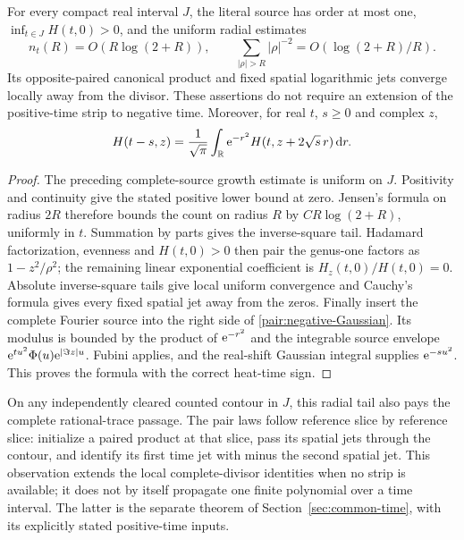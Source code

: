 \begin{proposition}
\label{pair:compact-time}
For every compact real interval $J$, the literal source has order at
most one, $\inf_{t\in J}H(t,0)>0$, and the uniform radial estimates
\[
 n_t(R)=O(R\log(2+R)),\qquad
 \sum_{|\rho|>R}|\rho|^{-2}=O(\log(2+R)/R).
\]
Its opposite-paired canonical product and fixed spatial logarithmic
jets converge locally away from the divisor. These assertions do not
require an extension of the positive-time strip to negative time.
Moreover, for real $t$, $s\ge0$ and complex $z$,
\begin{equation}
 H(t-s,z)=\frac1{\sqrt\pi}\int_\mathbb R
          \mathrm e^{-r^2}H(t,z+2\sqrt{s}\,r)\,\mathrm d r.
 \label{pair:negative-Gaussian}
\end{equation}
\end{proposition}
\begin{proof}
The preceding complete-source growth estimate is uniform on $J$.
Positivity and continuity give the stated positive lower bound at zero.
Jensen's formula on radius $2R$ therefore bounds the count on radius
$R$ by $C R\log(2+R)$, uniformly in $t$. Summation by parts gives the
inverse-square tail. Hadamard factorization, evenness and $H(t,0)>0$
then pair the genus-one factors as $1-z^2/\rho^2$; the remaining linear
exponential coefficient is $H_z(t,0)/H(t,0)=0$. Absolute inverse-square
tails give local uniform convergence and Cauchy's formula gives every
fixed spatial jet away from the zeros. Finally insert the complete
Fourier source into the right side of \eqref{pair:negative-Gaussian}.
Its modulus is bounded by the product of $\mathrm e^{-r^2}$ and the integrable
source envelope $\mathrm e^{tu^2}\Phi(u)\mathrm e^{|\Im z|u}$.
Fubini applies, and the real-shift Gaussian integral supplies
$\mathrm e^{-su^2}$. This proves the formula with the correct heat-time sign.
\end{proof}

On any independently cleared counted contour in $J$, this radial tail
also pays the complete rational-trace passage. The pair laws follow
reference slice by reference slice: initialize a paired product at that
slice, pass its spatial jets through the contour, and identify its first
time jet with minus the second spatial jet. This observation extends the
local complete-divisor identities when no strip is available; it does
not by itself propagate one finite polynomial over a time interval.
The latter is the separate theorem of Section~\ref{sec:common-time},
with its explicitly stated positive-time inputs.

